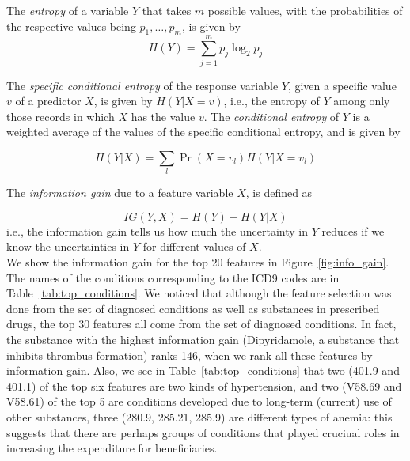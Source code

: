 The {\em entropy} \cite{Bishop06} of a variable $Y$ that takes $m$ possible values, with the probabilities of the respective values being $p_1,{\ldots}, p_m$, is given by 
\begin{equation}
\label{eqn:entropy}
H(Y) = \sum_{j=1}^{m}p_j\log_2{p_j}
\end{equation} 

The {\em specific conditional entropy} of the response variable $Y$, given a specific value $v$ of a predictor $X$, is given by $H(Y|X = v)$, i.e., the entropy of $Y$ among only those records in which $X$ has the value $v$. The {\em conditional entropy} of $Y$ is a weighted average of the values of the specific conditional entropy, and is given by 

\begin{equation}
\label{eqn:centropy}
H(Y|X) = \sum_{l}\Pr(X = v_l)H(Y|X = v_l)
\end{equation}
 
The {\em information gain} due to a feature variable $X$, is defined as 

\begin{equation}
\label{eqn:ig}
IG(Y, X) = H(Y) - H(Y|X)
\end{equation} 
i.e., the information gain tells us how much the uncertainty in $Y$ reduces if we know the uncertainties in $Y$ for different values of $X$.\\

We show the information gain for the top 20 features in Figure~\ref{fig:info_gain}. The names of the conditions corresponding to the ICD9 codes are in Table~\ref{tab:top_conditions}. We noticed that although the feature selection was done from the set of diagnosed conditions as well as substances in prescribed drugs, the top 30 features all come from the set of diagnosed conditions. In fact, the substance with the highest information gain (Dipyridamole, a substance that inhibits thrombus formation) ranks 146, when we rank all these features by information gain. Also, we see in Table~\ref{tab:top_conditions} that two (401.9 and 401.1) of the top six features are two kinds of hypertension, and two (V58.69 and V58.61) of the top 5 are conditions developed due to long-term (current) use of other substances, three (280.9, 285.21, 285.9) are different types of anemia: this suggests that there are perhaps groups of conditions that played cruciual roles in increasing the expenditure for beneficiaries. 

